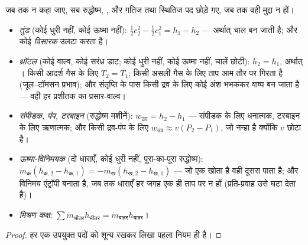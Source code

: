 \begin{proposition}\label{prop:b2:open-systems:devices}
जब तक न कहा जाए, सब रुद्धोष्म, , और गतिज तथा स्थितिज पद छोड़े गए,
जब तक वही मुद्दा न हों।
\begin{itemize}
\item \emph{तुंड} (कोई धुरी नहीं, कोई ऊष्मा नहीं): $\tfrac12c_2^2 -
      \tfrac12c_1^2 = h_1 - h_2$ --- अर्थात्  चाल बन जाती है; और कोई
      \emph{विसारक} उलटा करता है।
\item \emph{थ्रॉटल} (कोई वाल्व, कोई सरंध्र डाट; कोई धुरी नहीं,
      कोई ऊष्मा नहीं, चालें छोटी): $h_2 = h_1$, अर्थात् \emph{}। किसी
      आदर्श गैस के लिए $T_2 = T_1$; किसी असली गैस के लिए ताप आम तौर पर
      गिरता है (जूल--टॉमसन प्रभाव); और संतृप्ति के पास किसी द्रव के लिए कोई
      अंश भभककर वाष्प बन जाता है --- वही हर प्रशीतक का प्रसार-वाल्व।
\item \emph{संपीडक, पंप, टरबाइन} (रुद्धोष्म
      मशीनें): $w_{\text{उप}} = h_2 - h_1$ --- संपीडक के लिए धनात्मक,
      टरबाइन के लिए ऋणात्मक; और किसी द्रव-पंप के लिए $w_{\text{उप}} \approx
      v(P_2 - P_1)$, जो नन्हा है क्योंकि $v$ छोटा है।
\item \emph{ऊष्मा-विनिमयक} (दो धाराएँ, कोई
      धुरी नहीं, पूरा-का-पूरा रुद्धोष्म): $\dot m_{\text{क}}(h_{\text{क},2} -
      h_{\text{क},1}) = -\dot m_{\text{ख}}(h_{\text{ख},2} - h_{\text{ख},1})$
      --- जो एक खोता है वही दूसरा पाता है; और विनिमय एंट्रॉपी बनाता है,
      जब तक धाराएँ हर जगह एक ही ताप पर न हों
      (प्रति-प्रवाह उसे घटा देता है)।
\item \emph{मिश्रण कक्ष}: $\sum\dot m_{\text{भीतर}}h_{\text{भीतर}} = \dot
      m_{\text{बाहर}}h_{\text{बाहर}}$।
\end{itemize}
\end{proposition}

\begin{proof}
हर एक उपयुक्त पदों को शून्य रखकर लिखा पहला नियम ही है।
\end{proof}

